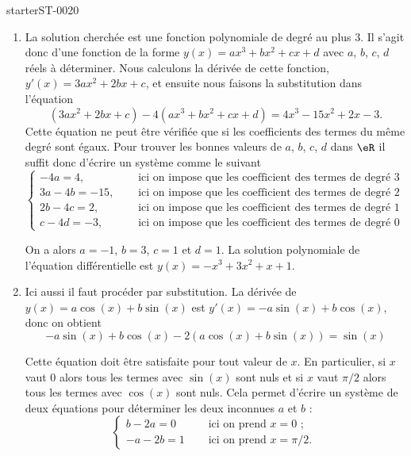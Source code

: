 
\begin{corrige}{starterST-0020}

 \begin{enumerate}
 \item La solution cherchée est une fonction polynomiale de degré au plus $3$. Il s'agit donc d'une fonction de la forme $y(x) = ax^3 + b x^2 + cx + d$ avec $a$, $b$, $c$, $d$ réels à déterminer. Nous calculons la dérivée de cette fonction, $y'(x) = 3ax^2 + 2b x + c$, et ensuite nous faisons la substitution dans l'équation 
   \[
   \left(3ax^2 + 2b x + c\right) - 4\left(ax^3 + b x^2 + cx + d\right) = 4x^3-15x^2+2x-3.
   \]
   Cette équation ne peut \^etre vérifiée que si les coefficients des termes du m\^eme degré sont égaux. Pour trouver les bonnes valeurs de $a$, $b$, $c$, $d$ dans $\eR$ il suffit donc d'écrire un système comme le suivant 
   \begin{equation*}
     \begin{cases}
       -4a = 4, \quad & \text{ ici on impose que les coefficient des termes de degré 3 soient égaux ; } \\
       3a -4b  = -15, \quad & \text{ ici on impose que les coefficient des termes de degré 2 soient égaux ; } \\
       2b -4c = 2, \quad & \text{ ici on impose que les coefficient des termes de degré 1 soient égaux ; } \\
       c-4d = -3, \quad & \text{ ici on impose que les coefficient des termes de degré 0 soient égaux. }
     \end{cases}
   \end{equation*}
   
   On a alors $a = -1$, $b = 3$, $c = 1$ et $d = 1$. La solution polynomiale de l'équation différentielle est  $y(x) = -x^3 + 3 x^2 + x +1$.  
 \item Ici aussi il faut procéder par substitution. La dérivée de $y(x) = a\cos (x)+ b\sin (x)$ est $y'(x) = -a\sin (x)+ b\cos (x)$, donc on obtient
   \[
   -a\sin (x)+ b\cos (x)  - 2\left( a\cos (x)+ b\sin (x)\right) = \sin(x)
   \]
      
      Cette équation doit \^etre satisfaite pour tout valeur de $x$. En particulier, si $x$ vaut $0$ alors tous les termes avec $\sin(x)$ sont nuls et si $x$ vaut $\pi/2$ alors tous les termes avec $\cos(x)$ sont nuls. Cela permet d'écrire un système de deux équations pour déterminer les deux inconnues $a$ et $b$ :
      \begin{equation*}
        \begin{cases}
          b  - 2 a = 0 \quad & \text{ ici on prend $x= 0 $ ; }  \\
          -a -2b = 1 \quad & \text{ ici on prend $x= \pi/2 $. } 
        \end{cases}
      \end{equation*}
 \end{enumerate}
 
\end{corrige}
